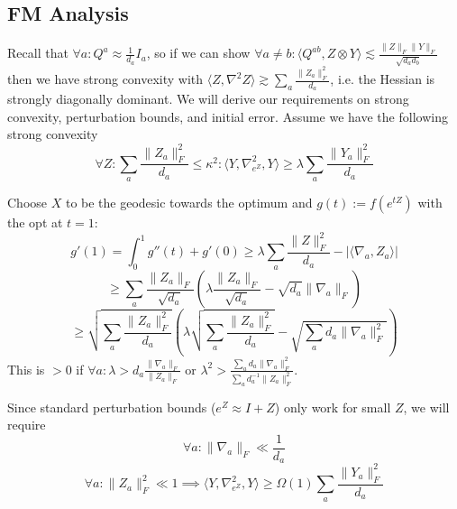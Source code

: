 \documentclass{article}
\begin{document}
\subsection{FM Analysis}
Recall that $\forall a: Q^{a} \approx \frac{1}{d_{a}} I_{a}$, so if we can show $\forall a \neq b: \langle Q^{ab}, Z \otimes Y \rangle \lesssim \frac{\|Z\|_{F} \|Y\|_{F}}{\sqrt{d_{a} d_{b}}}$ then we have strong convexity with $\langle Z, \nabla^{2} Z \rangle \gtrsim \sum_{a} \frac{\|Z_{a}\|_{F}^{2}}{d_{a}}$, i.e. the Hessian is strongly diagonally dominant. We will derive our requirements on strong convexity, perturbation bounds, and initial error. Assume we have the following strong convexity 
\[ \forall Z: \sum_{a} \frac{\|Z_{a}\|_{F}^{2}}{d_{a}} \leq \kappa^{2}: \langle Y, \nabla^{2}_{e^{Z}}, Y \rangle \geq \lambda \sum_{a} \frac{\|Y_{a}\|_{F}^{2}}{d_{a}}  \]

Choose $X$ to be the geodesic towards the optimum and $g(t) := f(e^{tZ})$ with the opt at $t=1$:
\[ g'(1) = \int_{0}^{1} g''(t) + g'(0) \geq \lambda \sum_{a} \frac{\|Z\|_{F}^{2}}{d_{a}} - |\langle \nabla_{a}, Z_{a} \rangle| \]
\[ \geq \sum_{a} \frac{\|Z_{a}\|_{F}}{\sqrt{d_{a}}} \left( \lambda \frac{\|Z_{a}\|_{F}}{\sqrt{d_{a}}} - \sqrt{d_{a}} \|\nabla_{a}\|_{F}  \right)  \]
\[ \geq \sqrt{\sum_{a} \frac{\|Z_{a}\|_{F}^{2}}{d_{a}}} \left( \lambda \sqrt{\sum_{a} \frac{\|Z_{a}\|_{F}^{2}}{d_{a}}} - \sqrt{\sum_{a} d_{a} \|\nabla_{a}\|_{F}^{2}} \right)  \]
This is $> 0$ if $\forall a: \lambda > d_{a} \frac{\|\nabla_{a}\|_{F}}{\|Z_{a}\|_{F}}$ or $\lambda^{2} > \frac{ \sum_{a} d_{a} \|\nabla_{a}\|_{F}^{2} }{\sum_{a} d_{a}^{-1} \|Z_{a}\|_{F}^{2}} $. 

Since standard perturbation bounds ($e^{Z} \approx I + Z$) only work for small $Z$, we will require
\[ \forall a: \|\nabla_{a}\|_{F} \ll \frac{1}{d_{a}} \]
\[ \forall a: \|Z_{a}\|_{F}^{2} \ll 1 \implies \langle Y, \nabla_{e^{Z}}^{2}, Y \rangle \geq \Omega(1) \sum_{a} \frac{\|Y_{a}\|_{F}^{2}}{d_{a}}   \]
\end{document}
